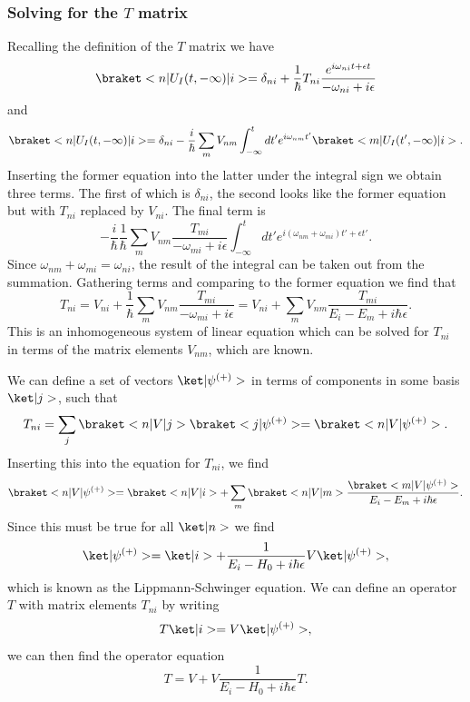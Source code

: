 \subsubsection{\texorpdfstring{Solving for the $T$ matrix}{Solving for the T matrix}}
Recalling the definition of the $T$ matrix we have
\begin{equation}
    \bkop{n}{U_I(t,-\infty)}{i} = \delta_{ni} + \frac{1}{\hbar} T_{ni} \frac{e^{i\omega_{ni}t + \epsilon t}}{-\omega_{ni}+ i\epsilon}
\end{equation}
and 
\begin{equation}
    \bkop{n}{U_I(t,-\infty)}{i} = \delta_{ni} - \frac{i}{\hbar} \sum_m V_{nm} \int_{-\infty}^{t} dt' e^{i\omega_{nm}t'} \bkop{m}{U_I(t', -\infty)}{i}.
\end{equation}
Inserting the former equation into the latter under the integral sign we obtain three terms. The first of which is $\delta_{ni}$, the second looks like the former equation but with $T_{ni}$ replaced by $V_{ni}.$ The final term is
\begin{equation}
    -\frac{i}{\hbar} \frac{1}{\hbar} \sum_m V_{nm} \frac{T_{mi}}{-\omega_{mi} + i\epsilon} \int_{-\infty}^{t} dt' e^{i(\omega_{nm} + \omega_{mi})t' + \epsilon t'}.
\end{equation}
Since $\omega_{nm} + \omega_{mi} = \omega_{ni}$, the result of the integral can be taken out from the summation. Gathering terms and comparing to the former equation we find that
\begin{equation}
    T_{ni} = V_{ni} + \frac{1}{\hbar} \sum_m V_{nm} \frac{T_{mi}}{-\omega_{mi} + i\epsilon} = V_{ni} + \sum_m V_{nm} \frac{T_{mi}}{E_i - E_m + i\hbar\epsilon}.
\end{equation}
This is an inhomogeneous system of linear equation which can be solved for $T_{ni}$ in terms of the matrix elements $V_{nm}$, which are known.

We can define a set of vectors $\k{\psi^{(+)}}$ in terms of components in some basis $\k{j}$, such that
\begin{equation}
    T_{ni} = \sum_j \bkop{n}{V}{j}\bk{j}{\psi^{(+)}} = \bkop{n}{V}{\psi^{(+)} }.
\end{equation}
Inserting this into the equation for $T_{ni}$, we find
\begin{equation}
    \bkop{n}{V}{\psi^{(+)} } = \bkop{n}{V}{i} + \sum_m \bkop{n}{V}{m} \frac{\bkop{m}{V}{\psi^{(+)}}}{E_i - E_m + i\hbar \epsilon}.
\end{equation}
Since this must be true for all $\k{n}$ we find 
\begin{equation}
    \k{\psi^{(+)}} = \k{i} + \frac{1}{E_i - H_0 + i\hbar \epsilon} V\k{\psi^{(+)}},
\end{equation}
which is known as the Lippmann-Schwinger equation. We can define an operator $T$ with matrix elements $T_{ni}$ by writing
\begin{equation}
    T\k{i} = V \k{\psi^{(+)}},
\end{equation}
we can then find the operator equation
\begin{equation}
    T = V + V\frac{1}{E_i - H_0 + i\hbar\epsilon}T. \label{eq:TV}
\end{equation}

